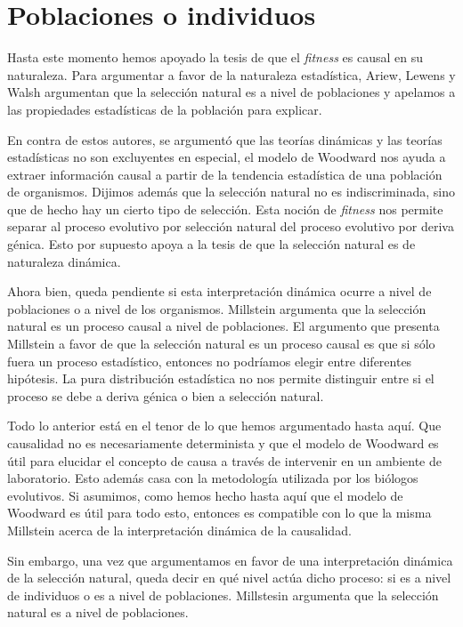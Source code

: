 \section{Poblaciones o individuos}

\noindent Hasta este momento hemos apoyado la tesis de que el \emph{fitness} es causal en su naturaleza. Para argumentar a favor de la naturaleza estadística, Ariew, Lewens y Walsh argumentan que la selección natural es a nivel de poblaciones y apelamos a las propiedades estadísticas de la población para explicar.

En contra de estos autores, se argumentó que las teorías dinámicas y las teorías estadísticas no son excluyentes en especial, el modelo de Woodward nos ayuda a extraer información causal a partir de la tendencia estadística de una población de organismos. Dijimos además que la selección natural no es indiscriminada, sino que de hecho hay un cierto tipo de selección. Esta noción de \emph{fitness} nos permite separar al proceso evolutivo por selección natural del proceso evolutivo por deriva génica. Esto por supuesto apoya a la tesis de que la selección natural es de naturaleza dinámica.

Ahora bien, queda pendiente si esta interpretación dinámica ocurre a nivel de poblaciones o a nivel de los organismos. Millstein \citeyear{Millstein2006} argumenta que la selección natural es un proceso causal a nivel de poblaciones. El argumento que presenta Millstein a favor de que la selección natural es un proceso causal es que si sólo fuera un proceso estadístico, entonces no podríamos elegir entre diferentes hipótesis. La pura distribución estadística no nos permite distinguir entre si el proceso se debe a deriva génica o bien a selección natural.

Todo lo anterior está en el tenor de lo que hemos argumentado hasta aquí. Que causalidad no es necesariamente determinista y que el modelo de Woodward es útil para elucidar el concepto de causa a través de intervenir en un ambiente de laboratorio. Esto además casa con la metodología utilizada por los biólogos evolutivos. Si asumimos, como hemos hecho hasta aquí que el modelo de Woodward es útil para todo esto, entonces es compatible con lo que la misma Millstein acerca de la interpretación dinámica de la causalidad.

Sin embargo, una vez que argumentamos en favor de una interpretación dinámica de la selección natural, queda decir en qué nivel actúa dicho proceso: si es a nivel de individuos o es a nivel de poblaciones. Millstesin argumenta que la selección natural es a nivel de poblaciones.

